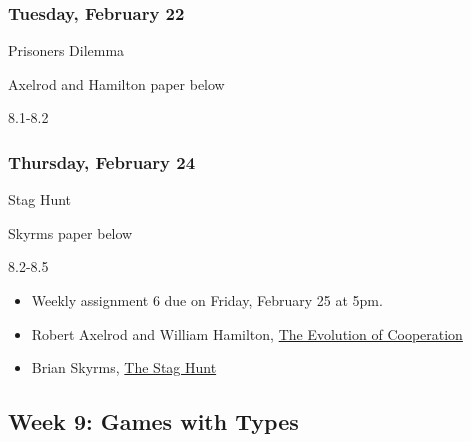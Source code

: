 \documentclass[
]{article}
\providecommand{\tightlist}{%
  \setlength{\itemsep}{0pt}\setlength{\parskip}{0pt}}
\begin{document}
\begin{multicols}{2}

\hypertarget{tuesday-february-22}{%
\subsubsection{Tuesday, February 22}\label{tuesday-february-22}}

\begin{description}
\tightlist
\item[Topic]
Prisoners Dilemma
\item[Reading]
Axelrod and Hamilton paper below
\item[Video lectures]
8.1-8.2
\end{description}

\hypertarget{thursday-february-24}{%
\subsubsection{Thursday, February 24}\label{thursday-february-24}}

\begin{description}
\tightlist
\item[Topic]
Stag Hunt
\item[Reading]
Skyrms paper below
\item[Video lectures]
8.2-8.5
\end{description}

\end{multicols}

\begin{itemize}
\tightlist
\item
  Weekly assignment 6 due on Friday, February 25 at 5pm.
\item
  Robert Axelrod and William Hamilton,
  \href{http://www-personal.umich.edu/~axe/research/Axelrod\%20and\%20Hamilton\%20EC\%201981.pdf}{The
  Evolution of Cooperation}
\item
  Brian Skyrms, \href{https://www.jstor.org/stable/3218711}{The Stag
  Hunt}
\end{itemize}

\newpage

\hypertarget{week-9-games-with-types}{%
\subsection{Week 9: Games with Types}\label{week-9-games-with-types}}
\end{document}
